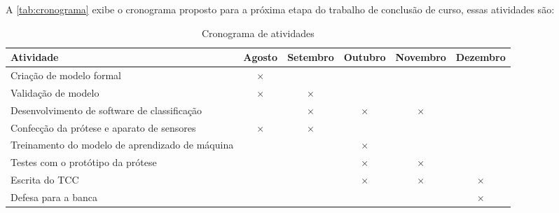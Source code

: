 A \autoref{tab:cronograma} exibe o cronograma proposto para a próxima etapa do trabalho de conclusão de curso, essas atividades são:

\begin{table}[htbp]
  \centering
  \caption{Cronograma de atividades}
  \label{tab:cronograma}
  \begin{tabularx}{\textwidth}{|X|c|c|c|c|c|}
    \hline
    \textbf{Atividade} & \textbf{Agosto} & \textbf{Setembro} & \textbf{Outubro} & \textbf{Novembro} & \textbf{Dezembro} \\
    \hline
    Criação de modelo formal & \(\times\) & & & & \\
    \hline
    Validação de modelo & \(\times\) & \(\times\)  &  & & \\
    \hline
    Desenvolvimento de software de classificação & & \(\times\) & \(\times\) & \(\times\) & \\
    \hline
    Confecção da prótese e aparato de sensores & \(\times\) & \(\times\) & & &  \\
    \hline
    Treinamento do modelo de aprendizado de máquina & & & \(\times\) & &  \\
    \hline
    Testes com o protótipo da prótese & & & \(\times\) & \(\times\) &  \\
    \hline
    Escrita do TCC & & & \(\times\) & \(\times\) &  \(\times\)\\
    \hline
    Defesa para a banca & & & & & \(\times\)  \\
    \hline
  \end{tabularx}
\end{table}